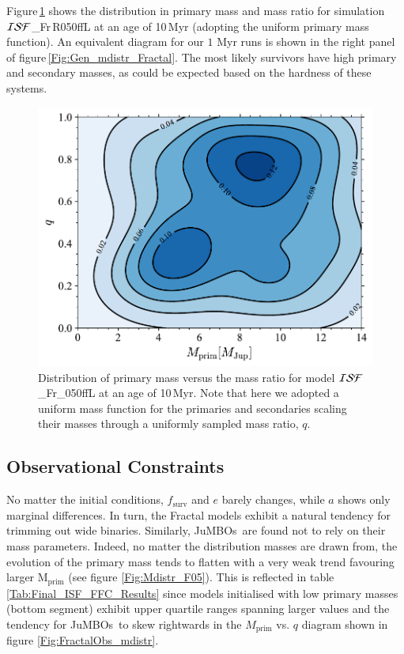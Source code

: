 \documentclass[submission,phys]{lib/SciPost}
\newcommand{\jumbos}{\mbox{JuMBOs}}
\begin{document}
Figure\,\ref{Fig:SimTime_MPrimQ} shows the distribution in
primary mass and mass ratio for simulation ${\cal ISF}$\_Fr\,R050ffL
at an age of 10\,Myr (adopting the uniform primary mass function). An
equivalent diagram for our $1$ Myr runs is shown in the right panel of
figure\,\ref{Fig:Gen_mdistr_Fractal}.  The most likely survivors have
high primary and secondary masses, as could be expected based on
the hardness of these systems.


\begin{figure}
    \centering
    \includegraphics[width=0.75\columnwidth]{figures/Fractal_rvir0.5_FF_10Myr_mass_distr.pdf}
    \caption{Distribution of primary mass versus the mass ratio for
      model ${\cal ISF}$\_Fr\_050ffL at an age of 10\,Myr.  Note that
      here we adopted a uniform mass function
      for the primaries and secondaries scaling their masses through a uniformly sampled
      mass ratio, $q$.}
         \label{Fig:SimTime_MPrimQ}
\end{figure}

\subsection{Observational Constraints}

No matter the initial conditions, $f_{\mathrm{surv}}$ and $e$ barely
changes, while $a$ shows only marginal differences.  In turn, the
Fractal models exhibit a natural tendency for trimming out wide
binaries. Similarly, \jumbos\ are found not to rely on their mass
parameters. Indeed, no matter the distribution masses are drawn from,
the evolution of the primary mass tends to flatten with a very weak
trend favouring larger $\mathrm{M_{\mathrm{prim}}}$ (see figure
\ref{Fig:Mdistr_F05}). This is reflected in table
\ref{Tab:Final_ISF_FFC_Results} since models initialised with low
primary masses (bottom segment) exhibit upper quartile ranges spanning
larger values and the tendency for \jumbos\ to skew rightwards in the
$M_{\mathrm{prim}}$ vs. $q$ diagram shown in figure
\ref{Fig:FractalObs_mdistr}.
\end{document}
